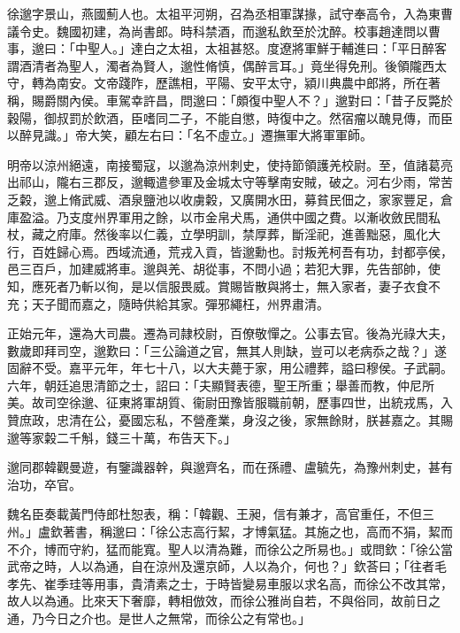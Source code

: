 
\begin{pinyinscope}
徐邈字景山，燕國薊人也。太祖平河朔，召為丞相軍謀掾，試守奉高令，入為東曹議令史。魏國初建，為尚書郎。時科禁酒，而邈私飲至於沈醉。校事趙達問以曹事，邈曰：「中聖人。」達白之太祖，太祖甚怒。度遼將軍鮮于輔進曰：「平日醉客謂酒清者為聖人，濁者為賢人，邈性脩慎，偶醉言耳。」竟坐得免刑。後領隴西太守，轉為南安。文帝踐阼，歷譙相，平陽、安平太守，潁川典農中郎將，所在著稱，賜爵關內侯。車駕幸許昌，問邈曰：「頗復中聖人不？」邈對曰：「昔子反斃於穀陽，御叔罰於飲酒，臣嗜同二子，不能自懲，時復中之。然宿瘤以醜見傳，而臣以醉見識。」帝大笑，顧左右曰：「名不虛立。」遷撫軍大將軍軍師。

明帝以涼州絕遠，南接蜀寇，以邈為涼州刺史，使持節領護羌校尉。至，值諸葛亮出祁山，隴右三郡反，邈輙遣參軍及金城太守等擊南安賊，破之。河右少雨，常苦乏糓，邈上脩武威、酒泉鹽池以收虜糓，又廣開水田，募貧民佃之，家家豐足，倉庫盈溢。乃支度州界軍用之餘，以市金帛犬馬，通供中國之費。以漸收斂民間私杖，藏之府庫。然後率以仁義，立學明訓，禁厚葬，斷淫祀，進善黜惡，風化大行，百姓歸心焉。西域流通，荒戎入貢，皆邈勳也。討叛羌柯吾有功，封都亭侯，邑三百戶，加建威將車。邈與羌、胡從事，不問小過；若犯大罪，先告部帥，使知，應死者乃斬以徇，是以信服畏威。賞賜皆散與將士，無入家者，妻子衣食不充；天子聞而嘉之，隨時供給其家。彈邪繩枉，州界肅清。

正始元年，還為大司農。遷為司隷校尉，百僚敬憚之。公事去官。後為光祿大夫，數歲即拜司空，邈歎曰：「三公論道之官，無其人則缺，豈可以老病忝之哉？」遂固辭不受。嘉平元年，年七十八，以大夫薨于家，用公禮葬，謚曰穆侯。子武嗣。六年，朝廷追思清節之士，詔曰：「夫顯賢表德，聖王所重；舉善而教，仲尼所美。故司空徐邈、征東將軍胡質、衞尉田豫皆服職前朝，歷事四世，出統戎馬，入贊庶政，忠清在公，憂國忘私，不營產業，身沒之後，家無餘財，朕甚嘉之。其賜邈等家糓二千斛，錢三十萬，布告天下。」

邈同郡韓觀曼遊，有鑒識器幹，與邈齊名，而在孫禮、盧毓先，為豫州刺史，甚有治功，卒官。

魏名臣奏載黃門侍郎杜恕表，稱：「韓觀、王昶，信有兼才，高官重任，不但三州。」盧欽著書，稱邈曰：「徐公志高行絜，才博氣猛。其施之也，高而不狷，絜而不介，博而守約，猛而能寬。聖人以清為難，而徐公之所易也。」或問欽：「徐公當武帝之時，人以為通，自在涼州及還京師，人以為介，何也？」欽荅曰；「往者毛孝先、崔季珪等用事，貴清素之士，于時皆變易車服以求名高，而徐公不改其常，故人以為通。比來天下奢靡，轉相倣效，而徐公雅尚自若，不與俗同，故前日之通，乃今日之介也。是世人之無常，而徐公之有常也。」


\end{pinyinscope}
